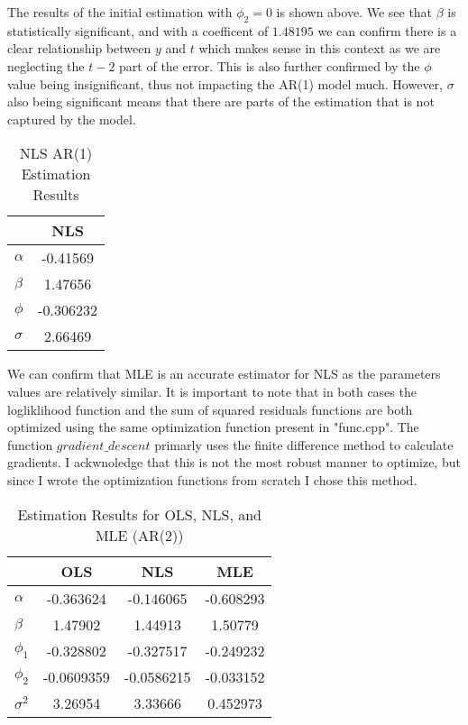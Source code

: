 \documentclass[12pt]{article}
\begin{document}
The results of the initial estimation with $\phi_2 = 0$ is shown above. We see that 
$\beta$ is statistically significant, and with a coefficent of $1.48195$ we 
can confirm there is a clear relationship between $y$ and $t$ which makes sense 
in this context as we are neglecting the $t-2$ part of the error. This is also 
further confirmed by the $\phi$ value being insignificant, thus not impacting 
the AR(1) model much. However, $\sigma$ also being significant means that 
there are parts of the estimation that is not captured by the model. 


\begin{table}[h!]
    \centering
    \begin{tabular}{lc}
        \toprule
        & NLS \\
        \midrule
        $\alpha$ & -0.41569 \\
        $\beta$ & 1.47656 \\
        $\phi$ & -0.306232 \\
        $\sigma$ & 2.66469 \\
        \bottomrule
    \end{tabular}
    \caption{NLS AR(1) Estimation Results}
    \label{tab:nls_results}
\end{table}

We can confirm that MLE is an accurate estimator for NLS as the parameters 
values are relatively similar. It is important to note that in both cases 
the logliklihood function and the sum of squared residuals functions are 
both optimized using the same optimization function present in "func.cpp". 
The function $gradient\_descent$ primarly uses the finite difference method 
to calculate gradients. I ackwnoledge that this is not the most robust 
manner to optimize, but since I wrote the optimization functions from scratch
I chose this method. 

\begin{table}[H]
    \centering
    \begin{tabular}{lccc}
        \toprule
        & OLS & NLS & MLE \\
        \midrule
        $\alpha$ & -0.363624 & -0.146065 & -0.608293 \\
        $\beta$ & 1.47902 & 1.44913 & 1.50779 \\
        $\phi_1$ & -0.328802 & -0.327517 & -0.249232 \\
        $\phi_2$ & -0.0609359 & -0.0586215 & -0.033152 \\
        $\sigma^2$ & 3.26954 & 3.33666 & 0.452973 \\
        \bottomrule
    \end{tabular}
    \caption{Estimation Results for OLS, NLS, and MLE (AR(2))}
    \label{tab:results_ar2}
\end{table}
\end{document}
